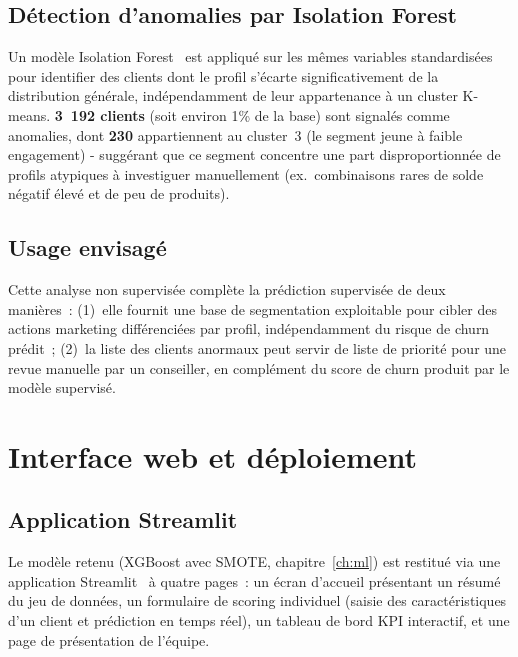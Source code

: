 \documentclass[11pt,a4paper]{report}
\begin{document}
\section{D\'etection d'anomalies par Isolation Forest}

Un mod\`ele Isolation Forest~\citep{liu2008isolation} est appliqu\'e sur les
m\^emes variables standardis\'ees pour identifier des clients dont le profil
s'\'ecarte significativement de la distribution g\'en\'erale, ind\'ependamment de
leur appartenance \`a un cluster K-means. \textbf{3~192 clients} (soit environ
1\% de la base) sont signal\'es comme anomalies, dont \textbf{230} appartiennent
au cluster~3 (le segment jeune \`a faible engagement) - sugg\'erant que ce
segment concentre une part disproportionn\'ee de profils atypiques \`a
investiguer manuellement (ex.\ combinaisons rares de solde n\'egatif \'elev\'e et
de peu de produits).

\section{Usage envisag\'e}

Cette analyse non supervis\'ee compl\`ete la pr\'ediction supervis\'ee de deux
mani\`eres~: (1)~elle fournit une base de segmentation exploitable pour cibler
des actions marketing diff\'erenci\'ees par profil, ind\'ependamment du risque de
churn pr\'edit~; (2)~la liste des clients anormaux peut servir de liste de
priorit\'e pour une revue manuelle par un conseiller, en compl\'ement du score
de churn produit par le mod\`ele supervis\'e.

\chapter{Interface web et d\'eploiement}
\label{ch:webapp}

\section{Application Streamlit}

Le mod\`ele retenu (XGBoost avec SMOTE, chapitre~\ref{ch:ml}) est restitu\'e via
une application Streamlit~\citep{streamlitdocs} \`a quatre pages~: un \'ecran
d'accueil pr\'esentant un r\'esum\'e du jeu de donn\'ees, un formulaire de
scoring individuel (saisie des caract\'eristiques d'un client et
pr\'ediction en temps r\'eel), un tableau de bord KPI interactif, et une page
de pr\'esentation de l'\'equipe.
\end{document}
